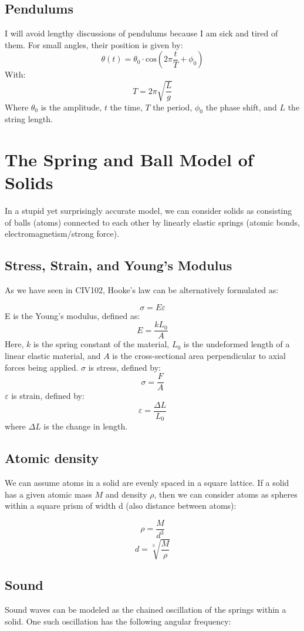 \documentclass{article}
\begin{document}
\subsection{Pendulums} I will avoid lengthy discussions of pendulums because I am sick and tired of them. For small angles, their position is given by:
$$\theta(t)=\theta_0\cdot \text{cos} \left( 2\pi \frac{t}{T} + \phi_0\right)$$
With:
$$T=2\pi \sqrt{\frac{L}{g}}$$
Where $\theta_0$ is the amplitude, $t$ the time, $T$ the period, $\phi_0$ the phase shift, and $L$ the string length.

\pagebreak
\section{The Spring and Ball Model of Solids}
In a stupid yet surprisingly accurate model, we can consider solids as consisting of balls (atoms) connected to each other by linearly elastic springs (atomic bonds, electromagnetism/strong force). 

\subsection{Stress, Strain, and Young's Modulus}

As we have seen in CIV102, Hooke's law can be alternatively formulated as:

$$\sigma=E \varepsilon$$
E is the Young's modulus, defined as:
$$E=\frac{kL_0}{A}$$
Here, $k$ is the spring constant of the material, $L_0$ is the undeformed length of a linear elastic material, and $A$ is the cross-sectional area perpendicular to axial forces being applied.
$\sigma$ is stress, defined by:
$$\sigma=\frac{F}{A}$$
$\varepsilon$ is strain, defined by:
$$\varepsilon=\frac{\Delta L}{L_0}$$
where $\Delta L$ is the change in length.

\subsection{Atomic density}
We can assume atoms in a solid are evenly spaced in a square lattice. If a solid has a given atomic mass $M$ and density $\rho$, then we can consider atoms as spheres within a square prism of width d (also distance between atoms):

$$\rho=\frac{M}{d^3}$$
$$d =\sqrt[3]{\frac{M}{\rho}}$$
\subsection{Sound}
Sound waves can be modeled as the chained oscillation of the springs within a solid. One such oscillation has the following angular frequency:
\end{document}

